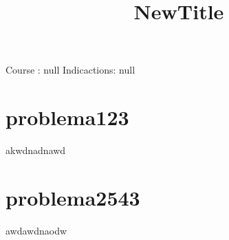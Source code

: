 \documentclass{article}
\title{NewTitle}
\begin{document}
 
\maketitle 
Course : null
Indicactions: 
null
\section{ problema123 } 
akwdnadnawd\section{ problema2543 } 
awdawdnaodw
\end{document}
